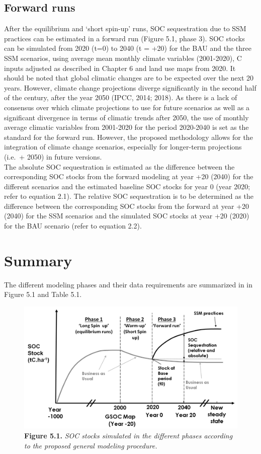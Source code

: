\documentclass[
  10pt,
  b5paper,
]{book}
\begin{document}
\hypertarget{forward-runs}{%
\subsection{Forward runs}\label{forward-runs}}

After the equilibrium and `short spin-up' runs, SOC sequestration due to SSM practices can be estimated in a forward run (Figure 5.1, phase 3). SOC stocks can be simulated from 2020 (t=0) to 2040 (t = +20) for the BAU and the three SSM scenarios, using average mean monthly climate variables (2001-2020), C inputs adjusted as described in Chapter 6 and land use maps from 2020.
It should be noted that global climatic changes are to be expected over the next 20 years. However, climate change projections diverge significantly in the second half of the century, after the year 2050 (IPCC, 2014; 2018). As there is a lack of consensus over which climate projections to use for future scenarios as well as a significant divergence in terms of climatic trends after 2050, the use of monthly average climatic variables from 2001-2020 for the period 2020-2040 is set as the standard for the forward run. However, the proposed methodology allows for the integration of climate change scenarios, especially for longer-term projections (i.e.~+ 2050) in future versions.\\
The absolute SOC sequestration is estimated as the difference between the corresponding SOC stocks from the forward modeling at year +20 (2040) for the different scenarios and the estimated baseline SOC stocks for year 0 (year 2020; refer to equation 2.1). The relative SOC sequestration is to be determined as the difference between the corresponding SOC stocks from the forward at year +20 (2040) for the SSM scenarios and the simulated SOC stocks at year +20 (2020) for the BAU scenario (refer to equation 2.2).

\hypertarget{summary}{%
\section{Summary}\label{summary}}

The different modeling phases and their data requirements are summarized in in Figure 5.1 and Table 5.1.

\begin{figure}
\centering
\includegraphics{images/Figure_5.1.png}
\caption{\textbf{Figure 5.1.} \emph{SOC stocks simulated in the different phases according to the proposed general modeling procedure.}}
\end{figure}
\end{document}
